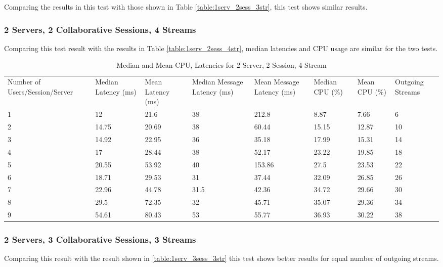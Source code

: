 Comparing the results in this test with those shown in Table \ref{table:1serv_2sess_3str}, this test shows similar results.

\subsubsection{2 Servers, 2 Collaborative Sessions, 4 Streams}

Comparing this test result with the results in Table \ref{table:1serv_2sess_4str}, median latencies and CPU usage are similar for the two tests.

\begin{table}
\caption{Median and Mean CPU, Latencies for 2 Server, 2 Session, 4 Stream}
\label{table:2serv_2sess_4str}
\begin{tabu} to\linewidth{|X[c]|X[c]|X[c]|X[c]|X[c]|X[c]|X[c]|X[c]|}
\everyrow{\hline}
\hline
Number of Users/Session/Server & Median Latency (ms) & Mean Latency (ms) & Median Message Latency (ms) & Mean Message Latency (ms) & Median CPU (\%) & Mean CPU (\%) & Outgoing Streams\\
1 & 12 & 21.6 & 38 & 212.8 & 8.87 & 7.66 & 6 \\
2 & 14.75 & 20.69 & 38 & 60.44 & 15.15 & 12.87 & 10 \\
3 & 14.92 & 22.95 & 36 & 35.18 & 17.99 & 15.31 & 14 \\
4 & 17 & 28.44 & 38 & 52.17 & 23.22 & 19.85 & 18 \\
5 & 20.55 & 53.92 & 40 & 153.86 & 27.5 & 23.53 & 22 \\
6 & 18.71 & 29.53 & 31 & 37.44 & 32.09 & 26.85 & 26 \\
7 & 22.96 & 44.78 & 31.5 & 42.36 & 34.72 & 29.66 & 30 \\
8 & 29.5 & 72.35 & 32 & 45.71 & 35.07 & 29.36 & 34 \\
9 & 54.61 & 80.43 & 53 & 55.77 & 36.93 & 30.22 & 38 \\
\end{tabu}
\end{table}

\clearpage\subsubsection{2 Servers, 3 Collaborative Sessions, 3 Streams}

Comparing this result with the result shown in \ref{table:1serv_3sess_3str} this test shows better results for equal number of outgoing streams.

